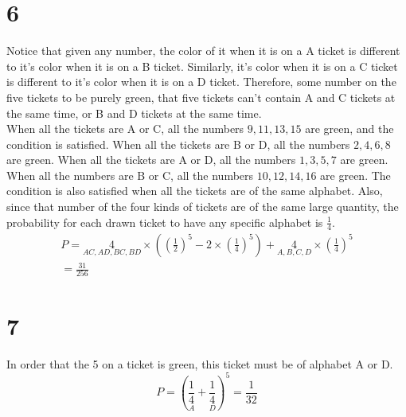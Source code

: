 \documentclass[11pt]{article}
\theoremstyle{definition}
\begin{document}
\section*{6}
Notice that given any number, the color of it when it is on a A ticket is different to it's color when it is on a B ticket. Similarly, it's color when it is on a C ticket is different to it's color when it is on a D ticket. Therefore, some number on the five tickets to be purely green, that five tickets can't contain A and C tickets at the same time, or B and D tickets at the same time. \\ 
When all the tickets are A or C, all the numbers $9, 11, 13, 15$ are green, and the condition is satisfied. When all the tickets are B or D, all the numbers $2, 4, 6, 8$ are green. When all the tickets are A or D, all the numbers $1, 3, 5, 7$ are green. When all the numbers are B or C, all the numbers $10, 12, 14, 16$ are green. The condition is also satisfied when all the tickets are of the same alphabet.
Also, since that number of the four kinds of tickets are of the same large quantity, the probability for each drawn ticket to have any specific alphabet is $\frac{1}{4}$.
\begin{gather*}
  P = \underset{AC, AD, BC, BD}{4}\times(\underset{}{(\frac{1}{2})^5} -  2\times\underset{}{(\frac{1}{4})^5}) + \underset{A, B, C, D}{4}\times(\frac{1}{4})^5 \\ 
  = \frac{31}{256}
\end{gather*}
\newpage
\section*{7}
In order that the 5 on a ticket is green, this ticket must be of alphabet A or D. 
\[
  P = (\underset{A}{\frac{1}{4}} + \underset{D}{\frac{1}{4}})^5 = \frac{1}{32}
\]
\newpage
\end{document}
